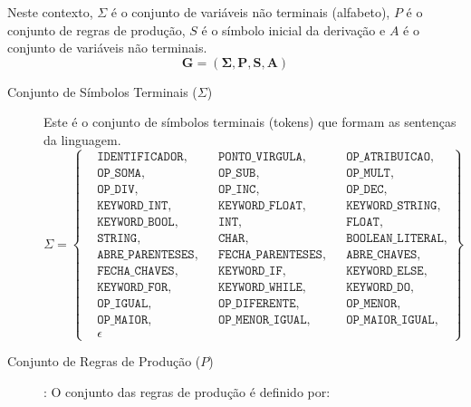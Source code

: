 \documentclass[12pt,a4paper]{article}
\newcommand{\tm}[1]{\ensuremath{\texttt{#1}}}
\begin{document}
Neste contexto, $\Sigma$ é o conjunto de variáveis não terminais (alfabeto), $P$ é o conjunto de regras de produção, $S$ é o símbolo inicial da derivação e $A$ é o conjunto de variáveis não terminais.
\begin{equation}
    \label{eq:gram}
    \boldsymbol{G = (\Sigma, P, S, A)}
\end{equation}

\begin{description}
  \item[Conjunto de Símbolos Terminais ($\Sigma$)] 
    Este é o conjunto de símbolos terminais (tokens) que formam as sentenças da linguagem.
    \[
    \Sigma = \left\{
        \begin{alignedat}{3}
        & \tm{IDENTIFICADOR}, && \tm{PONTO\_VIRGULA}, && \tm{OP\_ATRIBUICAO}, \\
        & \tm{OP\_SOMA}, && \tm{OP\_SUB}, && \tm{OP\_MULT}, \\
        & \tm{OP\_DIV}, && \tm{OP\_INC}, && \tm{OP\_DEC}, \\
        & \tm{KEYWORD\_INT}, && \tm{KEYWORD\_FLOAT}, && \tm{KEYWORD\_STRING}, \\
        & \tm{KEYWORD\_BOOL}, && \tm{INT}, && \tm{FLOAT}, \\
        & \tm{STRING}, && \tm{CHAR}, && \tm{BOOLEAN\_LITERAL}, \\
        & \tm{ABRE\_PARENTESES}, && \tm{FECHA\_PARENTESES}, && \tm{ABRE\_CHAVES}, \\
        & \tm{FECHA\_CHAVES}, && \tm{KEYWORD\_IF}, && \tm{KEYWORD\_ELSE}, \\
        & \tm{KEYWORD\_FOR}, && \tm{KEYWORD\_WHILE}, && \tm{KEYWORD\_DO}, \\
        & \tm{OP\_IGUAL}, && \tm{OP\_DIFERENTE}, && \tm{OP\_MENOR}, \\
        & \tm{OP\_MAIOR}, && \tm{OP\_MENOR\_IGUAL}, && \tm{OP\_MAIOR\_IGUAL}, \\
        & \epsilon
        \end{alignedat}
    \right\}
    \]

    \item[Conjunto de Regras de Produção ($P$)]: 
    O conjunto das regras de produção é definido por:


\end{description}
\end{document}
